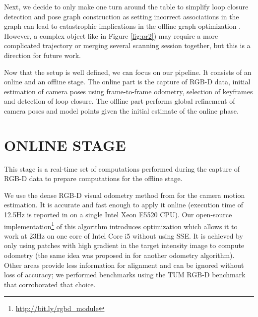 \documentclass[letterpaper, 10 pt, conference]{ieeeconf}  %
\begin{document}

Next, we decide to only make one turn around the table to simplify loop closure detection and pose graph construction as
setting incorrect associations
in the graph can lead to catastrophic implications in the offline graph
optimization \cite{sunderhauf2012switchable}.
However, a complex object like in Figure \ref{fig:pr2}) may require a more complicated trajectory
or merging several scanning session together, %
but this is a direction for future work.

Now that the setup is well defined, we can focus on our pipeline. It consists of an online and an 
offline stage. The online part is the capture of RGB-D data,
initial estimation of camera poses using frame-to-frame odometry,
selection of keyframes and detection of loop closure. The offline part performs
global refinement of camera poses and model points given the initial estimate of the online phase.

\section{ONLINE STAGE}

\label{sec:online}

This stage is a real-time set of computations performed during the capture of RGB-D data to prepare computations for 
the offline stage.

We use the dense RGB-D visual odometry
method from \cite{steinbrucker2011real} for the camera motion estimation.
It is accurate and fast enough to apply it online
(execution time of 12.5Hz is reported in \cite{steinbrucker2011real}
on a single Intel Xeon E5520 CPU).
Our open-source implementation\footnote{\label{note1}\href{http://bit.ly/rgbd\_module}{http://bit.ly/rgbd\_module}} of this algorithm
introduces optimization which allows it to work at 23Hz on one core
of Intel Core i5 without using SSE.
It is achieved by only using patches with high gradient in the target intensity image
to compute odometry (the same idea was proposed in \cite{tykkala2011direct} for another odometry algorithm).
Other areas provide less information for alignment
and can be ignored without loss of accuracy; we performed benchmarks 
using the TUM RGB-D benchmark \cite{sturm12iros} that corroborated that choice.
\end{document}
